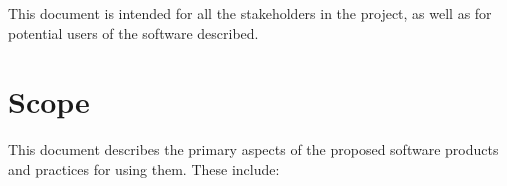 \documentclass[draftmode,draftwater]{memarticle}
\begin{document}
This document is intended for all the stakeholders in the project, as
well as for potential users of the software described.


\section{Scope\label{sec:scope}}

This document describes the primary aspects of the proposed software
products and practices for using them. These include:
\end{document}
